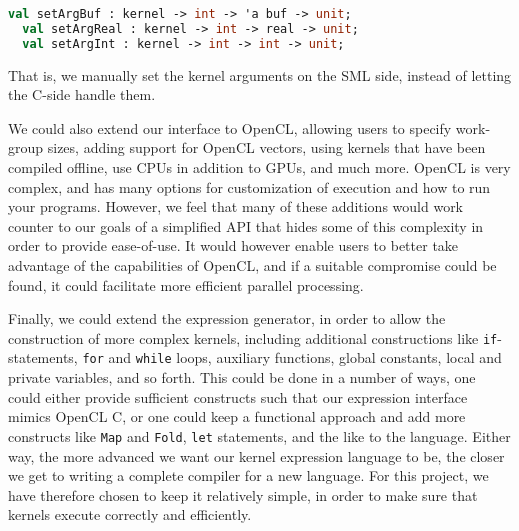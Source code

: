 \begin{lstlisting}[language=ML,mathescape]
  val setArgBuf : kernel -> int -> 'a buf -> unit;
  val setArgReal : kernel -> int -> real -> unit;
  val setArgInt : kernel -> int -> int -> unit;
\end{lstlisting}

That is, we manually set the kernel arguments on the SML side, instead
of letting the C-side handle them.

We could also extend our interface to OpenCL, allowing users to
specify work-group sizes, adding support for OpenCL vectors, using
kernels that have been compiled offline, use CPUs in addition to GPUs,
and much more. OpenCL is very complex, and has many options for
customization of execution and how to run your programs. However, we
feel that many of these additions would work counter to our goals of a
simplified API that hides some of this complexity in order to provide
ease-of-use. It would however enable users to better take advantage of
the capabilities of OpenCL, and if a suitable compromise could be
found, it could facilitate more efficient parallel processing.

Finally, we could extend the expression generator, in order to allow
the construction of more complex kernels, including additional
constructions like \texttt{if}-statements, \texttt{for} and
\texttt{while} loops, auxiliary functions, global constants, local and
private variables, and so forth. This could be done in a number of
ways, one could either provide sufficient constructs such that our
expression interface mimics OpenCL C, or one could keep a functional
approach and add more constructs like \texttt{Map} and \texttt{Fold},
\texttt{let} statements, and the like to the language. Either way, the
more advanced we want our kernel expression language to be, the closer
we get to writing a complete compiler for a new language. For this
project, we have therefore chosen to keep it relatively simple, in
order to make sure that kernels execute correctly and efficiently.
